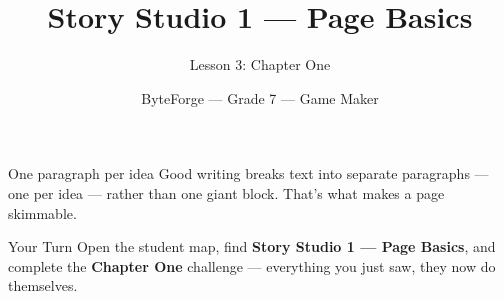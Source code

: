 \documentclass[aspectratio=169]{beamer}
\title{Story Studio 1 — Page Basics}
\subtitle{Lesson 3: Chapter One}
\author{ByteForge --- Grade 7 --- Game Maker}
\date{}
\begin{document}
\begin{frame}
    \titlepage
\end{frame}

\begin{frame}{One paragraph per idea}
    \Large
    Good writing breaks text into separate paragraphs — one per idea — rather than one giant block. That's what makes a page skimmable.
\end{frame}

\begin{frame}{Your Turn}
    \Large
    Open the student map, find \textbf{Story Studio 1 — Page Basics}, and complete
    the \textbf{Chapter One} challenge --- everything you just saw, they now do themselves.
\end{frame}
\end{document}
